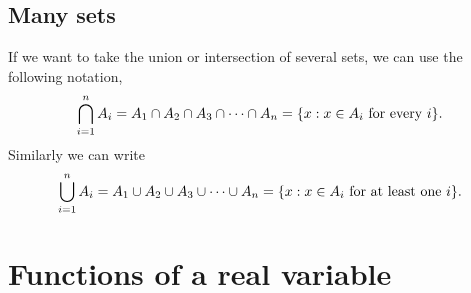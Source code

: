 \documentclass[10pt, a4paper]{article}
\begin{document}
\subsection{Many sets}
If we want to take the union or intersection of several sets, we can use the following notation,
\[
\bigcap_{i = 1}^{n}{A_i} = A_1 \cap A_2 \cap A_3 \cap \cdots \cap A_n = \{x : x \in A_i \textnormal{ for every } i\}.
\]
Similarly we can write
\[
\bigcup_{i = 1}^{n}{A_i} = A_1 \cup A_2 \cup A_3 \cup \cdots \cup A_n = \{x : x \in A_i \textnormal{ for at least one } i\}.
\]

\newpage

\section{Functions of a real variable}
\end{document}
